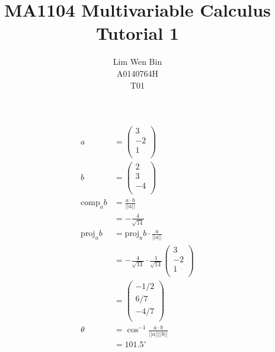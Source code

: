 \documentclass[12pt]{article}
\newenvironment{problem}[2][Problem]{\begin{trivlist}
\item[\hskip \labelsep {\bfseries #1}\hskip \labelsep {\bfseries #2.}]}{\end{trivlist}}
\begin{document}
\title{MA1104 Multivariable Calculus Tutorial 1}
\author{Lim Wen Bin \\
A0140764H\\
T01}
\maketitle

\begin{problem}{1}
\end{problem}
\begin{align*}
a &= \left( \begin{array}{c}
	3\\
	-2\\
	1\\
\end{array} \right) \\
b &= \left( \begin{array}{c}
	2\\
	3\\
	-4\\
\end{array} \right) \\
\text{comp}_a b &= \frac{a \cdot b}{||a||} \\
&= -\frac{4}{\sqrt{14}} \\
\text{proj}_a b &= \text{proj}_a b \cdot \frac{a}{||a||} \\
&= -\frac{4}{\sqrt{14}} 
\cdot 
\frac{1}{\sqrt{14}}
\left( \begin{array}{c}
	3\\
	-2\\
	1\\
\end{array} \right) \\
&=
\left( \begin{array}{c}
	-1/2\\
	6/7\\
	-4/7\\
\end{array} \right) \\
\theta &= \cos^{-1} \frac{a \cdot b}{||a||||b||}\\
&= 101.5 ^\circ
\end{align*}
\filbreak
\end{document}
